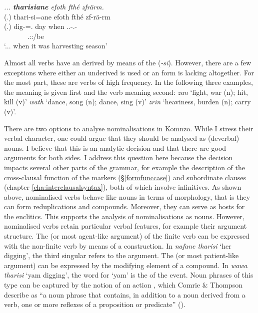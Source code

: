 \begin{exe}
	\ex \textit{... \textbf{tharisiane} efoth fthé zfrärm.}\\
	\glll (.) thari-si=ane efoth fthé zf-rä-rm\\
	(.) dig-\Nmlz{}=\Poss.\Sg{} day when \Tsg.\F.\Betatwo-\Cop.\Ndu-\Dur\\
	~ ~ ~ ~ {\Tsg.\F:\Pst:\Dur/be}\\
	\trans `... when it was harvesting season' 
	\label{ex011}
\end{exe}

Almost all verbs have an  derived by means of the  (\emph{-si}). However, there are a few exceptions where either an underived  is used or an  form is lacking altogether. For the most part, these are verbs of high frequency. In the following three examples, the  meaning is given first and the verb meaning second: \emph{zan} `fight, war (n); hit, kill (v)' \emph{wath} `dance, song (n); dance, sing (v)' \emph{zrin} `heaviness, burden (n); carry (v)'.%

There are two options to analyse nominalisations in Komnzo. While I stress their verbal character, one could argue that they should be analysed as (deverbal) nouns. I believe that this is an analytic decision and that there are good arguments for both sides. I address this question here because the decision impacts several other parts of the grammar, for example the description of the cross-clausal function of the  markers (\S\ref{formfunccase}) and subordinate clauses (chapter \ref{cha:interclausalsyntax}), both of which involve infinitives. As shown above, nominalised verbs behave like nouns in terms of morphology, that is they can form reduplications and  compounds. Moreover, they can serve as hosts for the  enclitics. This supports the analysis of nominalisations as nouns. However, nominalised verbs retain particular verbal features, for example their argument structure. The  (or most agent-like argument) of the finite verb can be expressed with the non-finite verb by means of a  construction. In \emph{nafane tharisi} `her digging', the third singular  refers to the  argument. The  (or most patient-like argument) can be expressed by the modifying element of a  compound. In \emph{wawa tharisi} `yam digging', the word for `yam' is the  of the event. Noun phrases of this type can be captured by the notion of an action , which Comrie \& Thompson describe as ``a noun phrase that contains, in addition to a noun derived from a verb, one or more reflexes of a proposition or predicate'' (\citeyear[343]{Comrie:2007nom}).%

